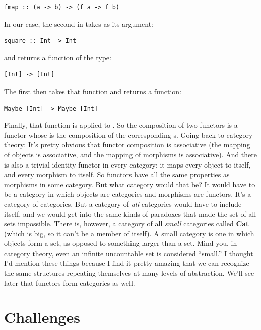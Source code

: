 \begin{Verbatim}[commandchars=\\\{\}]
fmap :: (a -> b) -> (f a -> f b)
\end{Verbatim}
In our case, the second  in  takes
as its argument:

\begin{Verbatim}[commandchars=\\\{\}]
square :: Int -> Int
\end{Verbatim}
and returns a function of the type:

\begin{Verbatim}[commandchars=\\\{\}]
[Int] -> [Int]
\end{Verbatim}
The first  then takes that function and returns a function:

\begin{Verbatim}[commandchars=\\\{\}]
Maybe [Int] -> Maybe [Int]
\end{Verbatim}
Finally, that function is applied to . So the composition of
two functors is a functor whose  is the composition of the
corresponding s. Going back to category theory: It's pretty
obvious that functor composition is associative (the mapping of objects
is associative, and the mapping of morphisms is associative). And there
is also a trivial identity functor in every category: it maps every
object to itself, and every morphism to itself. So functors have all the
same properties as morphisms in some category. But what category would
that be? It would have to be a category in which objects are categories
and morphisms are functors. It's a category of categories. But a
category of \emph{all} categories would have to include itself, and we
would get into the same kinds of paradoxes that made the set of all sets
impossible. There is, however, a category of all \emph{small} categories
called \textbf{Cat} (which is big, so it can't be a member of itself). A
small category is one in which objects form a set, as opposed to
something larger than a set. Mind you, in category theory, even an
infinite uncountable set is considered ``small.'' I thought I'd mention
these things because I find it pretty amazing that we can recognize the
same structures repeating themselves at many levels of abstraction.
We'll see later that functors form categories as well.

\section{Challenges}\label{challenges}

